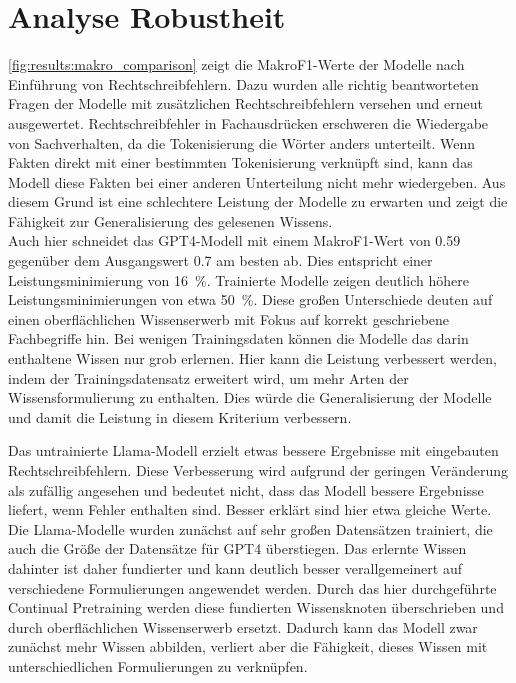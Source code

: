 \section{Analyse Robustheit}\label{sec:results:robustness}
\cref{fig:results:makro_comparison} zeigt die MakroF1-Werte der Modelle nach Einführung von Rechtschreibfehlern.
Dazu wurden alle richtig beantworteten Fragen der Modelle mit zusätzlichen Rechtschreibfehlern versehen und erneut ausgewertet.
Rechtschreibfehler in Fachausdrücken erschweren die Wiedergabe von Sachverhalten, da die Tokenisierung die Wörter anders unterteilt.
Wenn Fakten direkt mit einer bestimmten Tokenisierung verknüpft sind, kann das Modell diese Fakten bei einer anderen Unterteilung nicht mehr wiedergeben.
Aus diesem Grund ist eine schlechtere Leistung der Modelle zu erwarten und zeigt die Fähigkeit zur Generalisierung des gelesenen Wissens.\\

Auch hier schneidet das GPT4-Modell mit einem MakroF1-Wert von \num{0.59} gegenüber dem Ausgangswert \num{0.7} am besten ab.
Dies entspricht einer Leistungsminimierung von \SI{16}{\percent}. Trainierte Modelle zeigen deutlich höhere Leistungsminimierungen von etwa \SI{50}{\percent}.
Diese großen Unterschiede deuten auf einen oberflächlichen Wissenserwerb mit Fokus auf korrekt geschriebene Fachbegriffe hin.
Bei wenigen Trainingsdaten können die Modelle das darin enthaltene Wissen nur grob erlernen.
Hier kann die Leistung verbessert werden, indem der Trainingsdatensatz erweitert wird, um mehr Arten der Wissensformulierung zu enthalten.
Dies würde die Generalisierung der Modelle und damit die Leistung in diesem Kriterium verbessern.

Das untrainierte Llama-Modell erzielt etwas bessere Ergebnisse mit eingebauten Rechtschreibfehlern.
Diese Verbesserung wird aufgrund der geringen Veränderung als zufällig angesehen und bedeutet nicht, dass das Modell bessere Ergebnisse liefert, wenn Fehler enthalten sind.
Besser erklärt sind hier etwa gleiche Werte.
Die Llama-Modelle wurden zunächst auf sehr großen Datensätzen trainiert, die auch die Größe der Datensätze für GPT4 überstiegen.
Das erlernte Wissen dahinter ist daher fundierter und kann deutlich besser verallgemeinert auf verschiedene Formulierungen angewendet werden.
Durch das hier durchgeführte Continual Pretraining werden diese fundierten Wissensknoten überschrieben und durch oberflächlichen Wissenserwerb ersetzt.
Dadurch kann das Modell zwar zunächst mehr Wissen abbilden, verliert aber die Fähigkeit, dieses Wissen mit unterschiedlichen Formulierungen zu verknüpfen.\\

